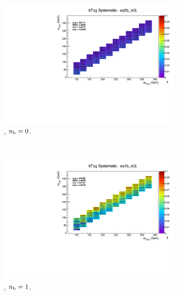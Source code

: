 \begin{figure}[ht!]
\begin{subfigure}[b]{0.32\textwidth}
    \includegraphics[width=\textwidth, page=1]{Figs/sms/t2degen/v19/systs_v2/T2_4body_bTag_eq0b_le3j.pdf}
    \caption{\njlow, $n_{\text{b}} = 0$.}
  \end{subfigure}\\
  \begin{subfigure}[b]{0.32\textwidth}
    \includegraphics[width=\textwidth, page=12]{Figs/sms/t2degen/v19/systs_v2/T2_4body_bTag_eq1b_le3j.pdf}
    \caption{\njlow, $n_{\text{b}} = 1$.}
  \end{subfigure}
  \begin{subfigure}[b]{0.32\textwidth}

\end{subfigure}
\end{figure}
